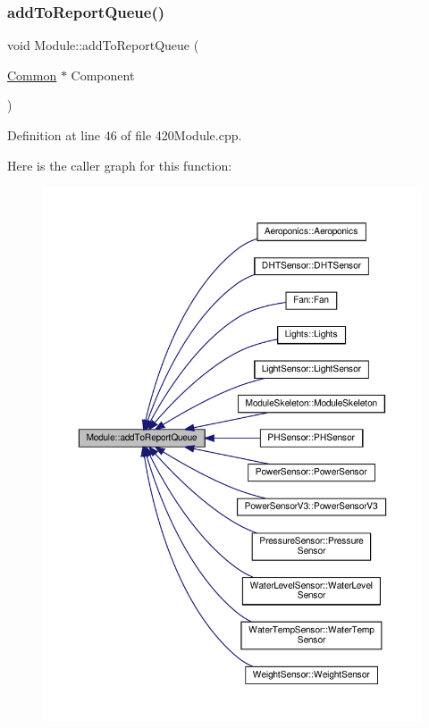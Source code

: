 \mbox{\label{class_module_aee2cbab440d38d29948205820ad50be8}} 
\subsubsection{\texorpdfstring{add\+To\+Report\+Queue()}{addToReportQueue()}\hspace{0.1cm}{\footnotesize\ttfamily [1/2]}}
{\footnotesize\ttfamily void Module\+::add\+To\+Report\+Queue (\begin{DoxyParamCaption}\item[{\hyperlink{class_common}{Common} $\ast$}]{Component }\end{DoxyParamCaption})}



Definition at line 46 of file 420\+Module.\+cpp.

Here is the caller graph for this function\+:
\nopagebreak
\begin{figure}[H]
\begin{center}
\leavevmode
\includegraphics[width=350pt]{class_module_aee2cbab440d38d29948205820ad50be8_icgraph}
\end{center}
\end{figure}
\mbox{\label{class_module_aee2cbab440d38d29948205820ad50be8}} 
